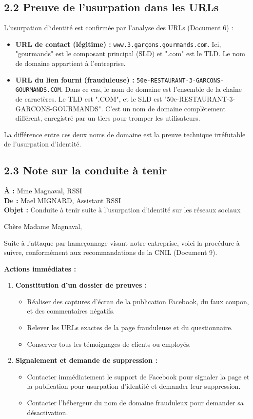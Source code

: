 \documentclass[12pt,a4paper]{article}
\begin{document}
\subsection*{2.2 Preuve de l'usurpation dans les URLs}
L'usurpation d'identité est confirmée par l'analyse des URLs (Document 6) :
\begin{itemize}
    	\item \textbf{URL de contact (légitime) :} \texttt{www.3.garçons.gourmands.com}. Ici, "gourmands" est le composant principal (SLD) et ".com" est le TLD. Le nom de domaine appartient à l'entreprise.
    	\item \textbf{URL du lien fourni (frauduleuse) :} \texttt{50e-RESTAURANT-3-GARCONS-GOURMANDS.COM}. Dans ce cas, le nom de domaine est l'ensemble de la chaîne de caractères. Le TLD est ".COM", et le SLD est "50e-RESTAURANT-3-GARCONS-GOURMANDS". C'est un nom de domaine complètement différent, enregistré par un tiers pour tromper les utilisateurs.
\end{itemize}
La différence entre ces deux noms de domaine est la preuve technique irréfutable de l'usurpation d'identité.
\clearpage
\subsection*{2.3 Note sur la conduite à tenir}
\textbf{À :} Mme Magnaval, RSSI \\
\textbf{De :} Mael MIGNARD, Assistant RSSI \\
\textbf{Objet :} Conduite à tenir suite à l'usurpation d'identité sur les réseaux sociaux

Chère Madame Magnaval,

Suite à l'attaque par hameçonnage visant notre entreprise, voici la procédure à suivre, conformément aux recommandations de la CNIL (Document 9).

\textbf{Actions immédiates :} 
\begin{enumerate}
    	\item \textbf{Constitution d'un dossier de preuves :} 
    	\begin{itemize}
        		\item Réaliser des captures d'écran de la publication Facebook, du faux coupon, et des commentaires négatifs.
        		\item Relever les URLs exactes de la page frauduleuse et du questionnaire.
        		\item Conserver tous les témoignages de clients ou employés.
    	\end{itemize}
    	\item \textbf{Signalement et demande de suppression :} 
    	\begin{itemize}
        		\item Contacter immédiatement le support de Facebook pour signaler la page et la publication pour usurpation d'identité et demander leur suppression.
        		\item Contacter l'hébergeur du nom de domaine frauduleux pour demander sa désactivation.
    	\end{itemize}
\end{enumerate}
\end{document}
